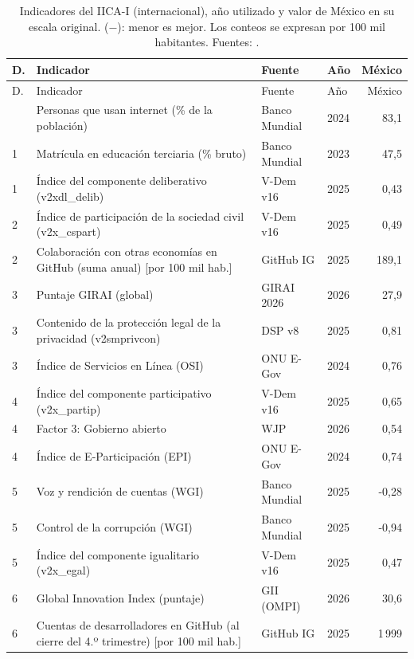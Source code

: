 {\footnotesize
\begin{longtable}{@{}p{0.4cm}>{\raggedright\arraybackslash}p{6.25cm}>{\raggedright\arraybackslash}p{1.8cm}p{0.7cm}r@{}}
\caption{Indicadores del IICA-I (internacional), año utilizado y valor de México en su escala original. ($-$): menor es mejor. Los conteos se expresan por 100 mil habitantes. Fuentes: \parencite{bancomundial_wdi,dsp_v8,girai2026,github_innovationgraph,undesa_egov2024,vdem_v16,wipo_gii2026,wjp_rolindex2026}.}\label{tab:ind-intl}\\
\toprule
D. & Indicador & Fuente & Año & México\\
\midrule
\endfirsthead
\toprule
D. & Indicador & Fuente & Año & México\\
\midrule
\endhead
\bottomrule
\endfoot
1 & Personas que usan internet (\% de la población) & Banco Mundial & 2024 & 83{,}1\\
1 & Matrícula en educación terciaria (\% bruto) & Banco Mundial & 2023 & 47{,}5\\
1 & Índice del componente deliberativo (v2xdl\_delib) & V-Dem v16 & 2025 & 0{,}43\\
2 & Índice de participación de la sociedad civil (v2x\_cspart) & V-Dem v16 & 2025 & 0{,}49\\
2 & Colaboración con otras economías en GitHub (suma anual) [por 100 mil hab.] & GitHub IG & 2025 & 189{,}1\\
3 & Puntaje GIRAI (global) & GIRAI 2026 & 2026 & 27{,}9\\
3 & Contenido de la protección legal de la privacidad (v2smprivcon) & DSP v8 & 2025 & 0{,}81\\
3 & Índice de Servicios en Línea (OSI) & ONU E-Gov & 2024 & 0{,}76\\
4 & Índice del componente participativo (v2x\_partip) & V-Dem v16 & 2025 & 0{,}65\\
4 & Factor 3: Gobierno abierto & WJP & 2026 & 0{,}54\\
4 & Índice de E-Participación (EPI) & ONU E-Gov & 2024 & 0{,}74\\
5 & Voz y rendición de cuentas (WGI) & Banco Mundial & 2025 & -0{,}28\\
5 & Control de la corrupción (WGI) & Banco Mundial & 2025 & -0{,}94\\
5 & Índice del componente igualitario (v2x\_egal) & V-Dem v16 & 2025 & 0{,}47\\
6 & Global Innovation Index (puntaje) & GII (OMPI) & 2026 & 30{,}6\\
6 & Cuentas de desarrolladores en GitHub (al cierre del 4.º trimestre) [por 100 mil hab.] & GitHub IG & 2025 & 1\,999\\
\end{longtable}
}
